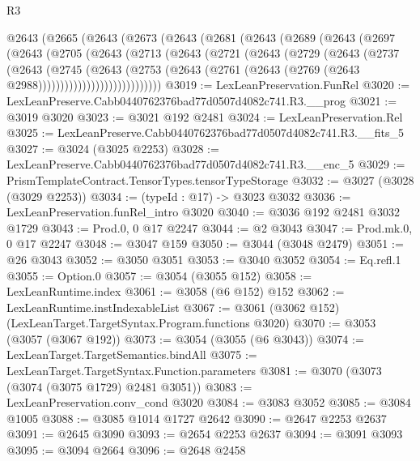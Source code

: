 \begin{lexlean}{R3}
\begin{coremodule}
  @2643
    (@2665
      (@2643
        (@2673
          (@2643
            (@2681
              (@2643
                (@2689
                  (@2643
                    (@2697
                      (@2643
                        (@2705
                          (@2643
                            (@2713
                              (@2643
                                (@2721
                                  (@2643
                                    (@2729
                                      (@2643
                                        (@2737
                                          (@2643
                                            (@2745
                                              (@2643
                                                (@2753
                                                  (@2643
                                                    (@2761
                                                      (@2643
                                                        (@2769
                                                          (@2643 @2988))))))))))))))))))))))))))))
@3019 := LexLeanPreservation.FunRel
@3020 := LexLeanPreserve.Cabb0440762376bad77d0507d4082c741.R3.__prog
@3021 := @3019 @3020
@3023 := @3021 @192 @2481
@3024 := LexLeanPreservation.Rel
@3025 := LexLeanPreserve.Cabb0440762376bad77d0507d4082c741.R3.__fits_5
@3027 := @3024 (@3025 @2253)
@3028 := LexLeanPreserve.Cabb0440762376bad77d0507d4082c741.R3.__enc_5
@3029 := PrismTemplateContract.TensorTypes.tensorTypeStorage
@3032 := @3027 (@3028 (@3029 @2253))
@3034 := (typeId : @17) -> @3023 @3032
@3036 := LexLeanPreservation.funRel_intro @3020
@3040 := @3036 @192 @2481 @3032 @1729
@3043 := Prod.{0, 0} @17 @2247
@3044 := @2 @3043
@3047 := Prod.mk.{0, 0} @17 @2247
@3048 := @3047 @159
@3050 := @3044 (@3048 @2479)
@3051 := @26 @3043
@3052 := @3050 @3051
@3053 := @3040 @3052
@3054 := Eq.refl.{1}
@3055 := Option.{0}
@3057 := @3054 (@3055 @152)
@3058 := LexLeanRuntime.index
@3061 := @3058 (@6 @152) @152
@3062 := LexLeanRuntime.instIndexableList
@3067 := @3061 (@3062 @152) (LexLeanTarget.TargetSyntax.Program.functions @3020)
@3070 := @3053 (@3057 (@3067 @192))
@3073 := @3054 (@3055 (@6 @3043))
@3074 := LexLeanTarget.TargetSemantics.bindAll
@3075 := LexLeanTarget.TargetSyntax.Function.parameters
@3081 := @3070 (@3073 (@3074 (@3075 @1729) @2481 @3051))
@3083 := LexLeanPreservation.conv_cond @3020
@3084 := @3083 @3052
@3085 := @3084 @1005
@3088 := @3085 @1014 @1727 @2642
@3090 := @2647 @2253 @2637
@3091 := @2645 @3090
@3093 := @2654 @2253 @2637
@3094 := @3091 @3093
@3095 := @3094 @2664
@3096 := @2648 @2458

\end{coremodule}
\end{lexlean}
